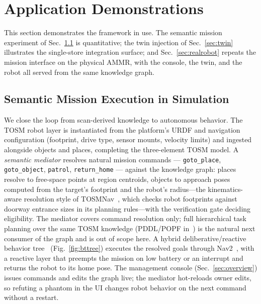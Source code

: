 \section{Application Demonstrations}
\label{sec:applications}

This section demonstrates the framework in use. The semantic mission
experiment of Sec.~\ref{sec:semnav} is quantitative; the twin injection
of Sec.~\ref{sec:twin} illustrates the single-store integration surface;
and Sec.~\ref{sec:realrobot} repeats the mission interface on the
physical AMMR, with the console, the twin, and the robot all served from
the same knowledge graph.

\subsection{Semantic Mission Execution in Simulation}
\label{sec:semnav}

We close the loop from scan-derived knowledge to autonomous behavior. The
TOSM robot layer is instantiated from the platform's URDF and navigation
configuration (footprint, drive type, sensor mounts, velocity limits) and
ingested alongside objects and places, completing the three-element TOSM
model. A \emph{semantic mediator} resolves natural mission commands ---
\texttt{goto\_place}, \texttt{goto\_object}, \texttt{patrol},
\texttt{return\_home} --- against the knowledge graph: places resolve to
free-space points at region centroids, objects to approach poses computed
from the target's footprint and the robot's radius---the kinematics-aware
resolution style of TOSMNav~\cite{joo2022fsom}, which checks robot
footprints against doorway entrance sizes in its planning rules---with
the verification gate deciding eligibility. The mediator covers command
resolution only; full hierarchical task planning over the same TOSM
knowledge (PDDL/POPF in~\cite{joo2022fsom}) is the natural next consumer
of the graph and is out of scope here. A hybrid deliberative/reactive behavior
tree~\cite{colledanchise2018bt,iovino2022btsurvey}
(Fig.~\ref{fig:bttree}) executes the resolved goals through
Nav2~\cite{macenski2020marathon}, with a
reactive layer that preempts the mission on low battery or an interrupt
and returns the robot to its home pose. The management console
(Sec.~\ref{sec:overview}) issues commands and edits the graph live; the
mediator hot-reloads owner edits, so refuting a phantom in the UI changes
robot behavior on the next command without a restart.

